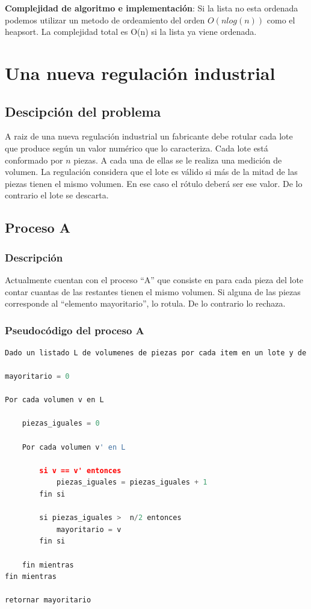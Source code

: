 \documentclass{article}
\begin{document}
\textbf{Complejidad de algoritmo e implementación}: Si la lista no esta ordenada podemos utilizar un metodo de ordeamiento del orden \(O(n log(n))\) como el heapsort. 
La complejidad total es O(n) si la lista ya viene ordenada. 

\newpage
\section{Una nueva regulación industrial}

\subsection{Descipción del problema}
A raiz de una nueva regulación industrial un fabricante debe rotular cada lote que produce según un valor numérico que lo caracteriza. 
Cada lote está conformado por \(n\) piezas. A cada una de ellas se le realiza una medición de volumen. La regulación considera que el lote es válido si más de la mitad de las piezas tienen el mismo volumen. 
En ese caso el rótulo deberá ser ese valor. De lo contrario el lote se descarta.

\subsection{Proceso A}

\subsubsection{Descripción}
Actualmente cuentan con el proceso “A” que consiste en para cada pieza del lote contar cuantas de las restantes tienen el mismo volumen. 
Si alguna de las piezas corresponde al “elemento mayoritario”, lo rotula. De lo contrario lo rechaza.

\newpage
\subsubsection{Pseudocódigo del proceso A}

\begin{lstlisting}[language=Python, caption=Algoritmo del proceso A]
Dado un listado L de volumenes de piezas por cada item en un lote y de n elementos.

mayoritario = 0

Por cada volumen v en L
    
    piezas_iguales = 0

    Por cada volumen v' en L

        si v == v' entonces 
            piezas_iguales = piezas_iguales + 1
        fin si

        si piezas_iguales >  n/2 entonces
            mayoritario = v
        fin si

    fin mientras
fin mientras

retornar mayoritario

\end{lstlisting}
\end{document}
